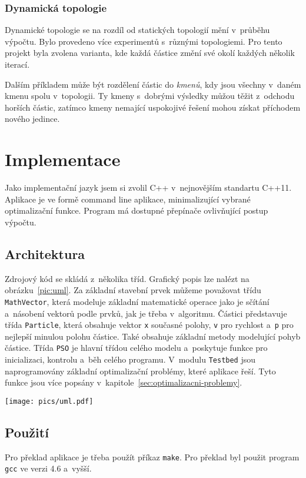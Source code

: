\documentclass[12pt,a4paper,fleqn]{article}
\begin{document}
\subsubsection{Dynamická topologie}
Dynamické topologie se na rozdíl od statických topologií mění v~průběhu výpočtu.  Bylo provedeno více experimentů s~různými topologiemi. Pro tento projekt byla zvolena varianta, kde každá částice změní své okolí každých několik iterací. 

Dalším příkladem může být rozdělení částic do \textit{kmenů}, kdy jsou všechny v~daném kmenu spolu v~topologii. Ty kmeny s~dobrými výsledky můžou těžit z~odchodu horších částic, zatímco kmeny nemající uspokojivé řešení mohou získat příchodem nového jedince.

\newpage
\section{Implementace} \label{implementace}
Jako implementační jazyk jsem si zvolil C++ v~nejnovějším standartu C++11. Aplikace je ve formě command line aplikace, minimalizující vybrané optimalizační funkce. Program má dostupné přepínače ovlivňující postup výpočtu.

\subsection{Architektura}
Zdrojový kód se skládá z~několika tříd. Grafický popis lze nalézt na obrázku~\ref{pic:uml}. Za základní stavební prvek můžeme považovat třídu \texttt{MathVector}, která modeluje základní matematické operace jako je sčítání a~násobení vektorů podle prvků, jak je třeba v~algoritmu. Částici představuje třída \texttt{Particle}, která obsahuje vektor \texttt{x} současné polohy, \texttt{v} pro rychlost a~\texttt{p} pro nejlepší minulou polohu částice. Také obsahuje základní metody modelující pohyb částice. Třída \texttt{PSO} je hlavní třídou celého modelu a~poskytuje funkce pro inicializaci, kontrolu a~běh celého programu. V~modulu \texttt{Testbed} jsou naprogramovány základní optimalizační problémy, které aplikace řeší. Tyto funkce jsou více popsány v~kapitole~\ref{sec:optimalizacni-problemy}.
\begin{figure*}[h!]
\centering
\texttt{[image: pics/uml.pdf]}
\caption{UML diagram důležitých částí výsledného programu}
\label{pic:uml}
\end{figure*}

\subsection{Použití}
Pro překlad aplikace je třeba použít příkaz \texttt{make}. Pro překlad byl použit program \texttt{gcc} ve verzi 4.6 a~vyšší.
\end{document}
